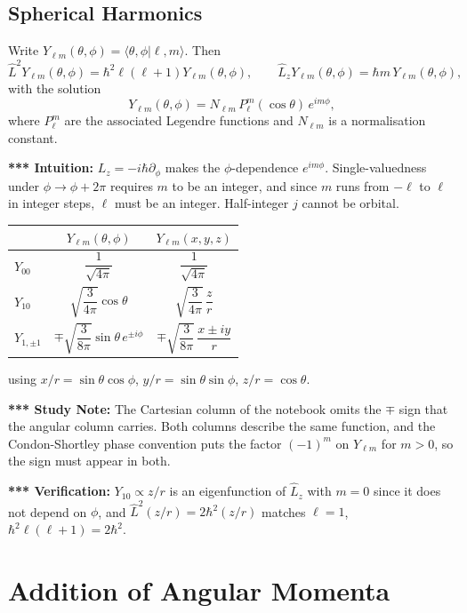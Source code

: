 \documentclass[11pt,a4paper]{article}
\begin{document}
\subsection{Spherical Harmonics}
Write $Y_{\ell m}(\theta,\phi)=\langle\theta,\phi|\ell,m\rangle$. Then
\[
\hat L^2Y_{\ell m}(\theta,\phi)=\hbar^2\ell(\ell+1)Y_{\ell m}(\theta,\phi),\qquad \hat L_zY_{\ell m}(\theta,\phi)=\hbar m\,Y_{\ell m}(\theta,\phi),
\]
with the solution
\[
Y_{\ell m}(\theta,\phi)=N_{\ell m}\,P_\ell^m(\cos\theta)\,e^{im\phi},
\]
where $P_\ell^m$ are the associated Legendre functions and $N_{\ell m}$ is a normalisation constant.

\textbf{*** Intuition:} $L_z=-i\hbar\partial_\phi$ makes the $\phi$-dependence $e^{im\phi}$. Single-valuedness under $\phi\to\phi+2\pi$ requires $m$ to be an integer, and since $m$ runs from $-\ell$ to $\ell$ in integer steps, $\ell$ must be an integer. Half-integer $j$ cannot be orbital.

\begin{center}
\renewcommand{\arraystretch}{1.6}
\begin{tabular}{@{}lcc@{}}
\toprule
 & $Y_{\ell m}(\theta,\phi)$ & $Y_{\ell m}(x,y,z)$\\
\midrule
$Y_{00}$ & $\dfrac1{\sqrt{4\pi}}$ & $\dfrac1{\sqrt{4\pi}}$\\
$Y_{10}$ & $\sqrt{\dfrac3{4\pi}}\cos\theta$ & $\sqrt{\dfrac3{4\pi}}\,\dfrac zr$\\
$Y_{1,\pm1}$ & $\mp\sqrt{\dfrac3{8\pi}}\sin\theta\,e^{\pm i\phi}$ & $\mp\sqrt{\dfrac3{8\pi}}\,\dfrac{x\pm iy}r$\\
\bottomrule
\end{tabular}
\end{center}
using $x/r=\sin\theta\cos\phi$, $y/r=\sin\theta\sin\phi$, $z/r=\cos\theta$.

\textbf{*** Study Note:} The Cartesian column of the notebook omits the $\mp$ sign that the angular column carries. Both columns describe the same function, and the Condon-Shortley phase convention puts the factor $(-1)^m$ on $Y_{\ell m}$ for $m>0$, so the sign must appear in both.

\textbf{*** Verification:} $Y_{10}\propto z/r$ is an eigenfunction of $\hat L_z$ with $m=0$ since it does not depend on $\phi$, and $\hat L^2(z/r)=2\hbar^2(z/r)$ matches $\ell=1$, $\hbar^2\ell(\ell+1)=2\hbar^2$.

\section{Addition of Angular Momenta}
\label{sy:sec:add}
\end{document}
